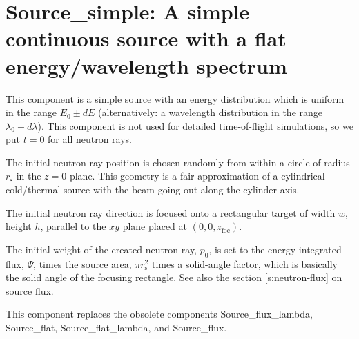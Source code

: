 \section{Source\_simple: A simple continuous source
with a flat energy/wavelength spectrum}
\label{source-simple}


This component is
a simple source with an energy distribution which is uniform
in the range $E_0 \pm dE$
(alternatively: a wavelength distribution in the range $\lambda_0 \pm d\lambda$).
This component is not used for detailed time-of-flight simulations,
so we put $t=0$ for all neutron rays.

The initial neutron ray position is chosen randomly from within a
circle of radius $r_\textrm{s}$ in the $z=0$ plane.
This geometry is a fair approximation
of a cylindrical cold/thermal source with the beam going out along
the cylinder axis.

The initial neutron ray direction is focused onto a rectangular target of width
$w$, height $h$, parallel to the $xy$ plane placed at $(0,0,z_\textrm{foc})$.

The initial weight of the created neutron ray, $p_0$, is set to the
energy-integrated flux, $\Psi$, times the source area, $\pi r_\textrm{s}^2$
times a solid-angle factor, which is basically the
solid angle of the focusing rectangle.
See also the section \ref{s:neutron-flux} on source flux.

This component replaces the obsolete components
Source\_flux\_lambda, Source\_flat, Source\_flat\_lambda, and Source\_flux.
